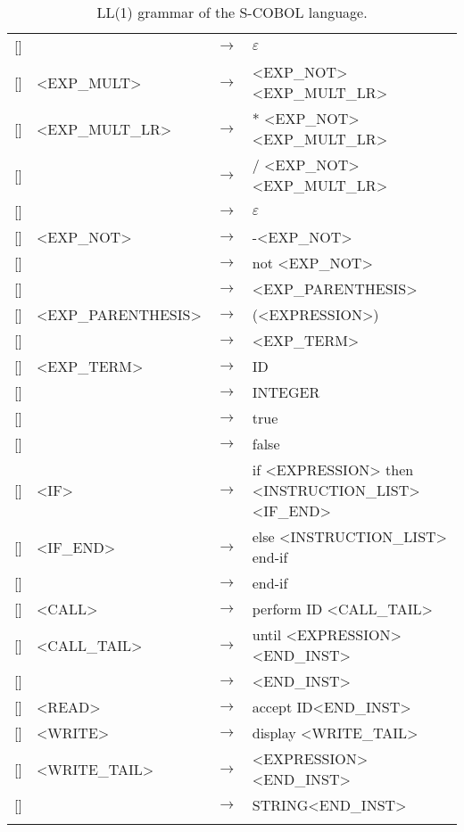 \documentclass[a4paper,11pt]{article}
\newcounter{rule}
\newcommand{\addRule}[2]{%
	\stepcounter{rule} [\arabic{rule}] & #1 & $\rightarrow$ & #2 \tabularnewline
}
\begin{document}
\begin{longtable}{lll>{\raggedright}p{10cm}}
	\addRule{}{$\varepsilon$}
	\addRule{<EXP\_MULT>}{<EXP\_NOT> <EXP\_MULT\_LR>}
	\addRule{<EXP\_MULT\_LR>}{* <EXP\_NOT> <EXP\_MULT\_LR>}
	\addRule{}{/ <EXP\_NOT> <EXP\_MULT\_LR>}
	\addRule{}{$\varepsilon$}
	\addRule{<EXP\_NOT>}{-<EXP\_NOT>}
	\addRule{}{not <EXP\_NOT>}
	\addRule{}{<EXP\_PARENTHESIS>}
	\addRule{<EXP\_PARENTHESIS>}{(<EXPRESSION>)}
	\addRule{}{<EXP\_TERM>}
	\addRule{<EXP\_TERM>}{ID}
	\addRule{}{INTEGER}
	\addRule{}{true}
	\addRule{}{false}
	\addRule{<IF>}{if <EXPRESSION> then <INSTRUCTION\_LIST> <IF\_END>}
	\addRule{<IF\_END>}{else <INSTRUCTION\_LIST> end-if}
	\addRule{}{end-if}
	\addRule{<CALL>}{perform ID <CALL\_TAIL>}
	\addRule{<CALL\_TAIL>}{until <EXPRESSION><END\_INST>}
	\addRule{}{<END\_INST>}
	\addRule{<READ>}{accept ID<END\_INST>}
	\addRule{<WRITE>}{display <WRITE\_TAIL>}
	\addRule{<WRITE\_TAIL>}{<EXPRESSION><END\_INST>}
	\addRule{}{STRING<END\_INST>}

	\caption{LL(1) grammar of the S-COBOL language.}
	\label{tab:grammar}
\end{longtable}
\end{document}
